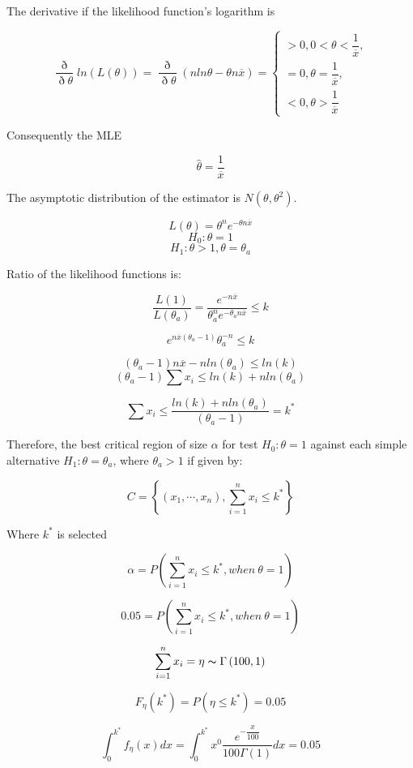 \documentclass[12pt]{article}
\begin{document}
\begin{list}{()~}{}
The derivative if the likelihood function's logarithm is

\[\dfrac{\eth}{\eth \theta}ln\left(L\left(\theta\right)\right)=\dfrac{\eth}{\eth \theta}\left(n ln\theta-\theta n \overline{x}\right)=\left\{
\begin{array}{l}
>0, 0 < \theta < \dfrac{1}{\overline{x}},\\
=0, \theta=\dfrac{1}{\overline{x}},\\
<0, \theta > \dfrac{1}{\overline{x}}
\end{array} \right. \]

Consequently the MLE

\[\hat{\theta}=\dfrac{1}{\overline{x}}\]

The asymptotic distribution of the estimator is $N\left(\theta, \theta^2\right)$.

\item
\[L\left(\theta\right)=\theta^n e^{-\theta n \overline{x}}\]
\[H_0: \theta = 1\]
\[H_1: \theta>1, \theta = \theta_a\]

Ratio of the likelihood functions is:

\[\dfrac{L\left(1\right)}{L\left(\theta_a\right)}=\dfrac{e^{-n\overline{x}}}{\theta_a^n e^{-\theta_a n \overline{x}}}\leq k\]

\[e^{n\overline{x}\left(\theta_a-1\right)}\theta_a^{-n}\leq k\]

\[\left(\theta_a-1\right)n\overline{x}-n ln\left(\theta_a\right)\leq ln(k)\]
\[\left(\theta_a-1\right)\sum x_i \leq ln\left(k\right)+nln\left(\theta_a\right)\]

\[\sum x_i \leq \dfrac{ln\left(k\right)+nln\left(\theta_a\right)}{\left(\theta_a-1\right)}=k^*\]

Therefore,  the best critical region of size $\alpha$ for test $H_0: \theta=1$ against each simple alternative $H_1: \theta=\theta_a$, where $\theta_a>1$ if given by:

\[ C =\left\{\left(x_1, \cdots, x_n\right), \sum_{i=1}^n x_i\leq k^*\right\}\]

Where $k^*$ is selected 

\[\alpha = P\left(\sum_{i=1}^n x_i \leq k^*, when\  \theta=1\right)\]

\[0.05 = P\left(\sum_{i=1}^n x_i \leq k^*, when\  \theta=1\right)\]

\[\sum_{i=1}^n x_i = \eta \thicksim \Gamma\left(100, 1\right)\]

\[F_\eta\left(k^*\right)=P\left(\eta\leq k^*\right)=0.05\]

\[\int_0^{k^*}f_\eta\left( x\right)dx=\int_0^{k^*}x^0 \dfrac{e^{-\dfrac{x}{100}}}{100\Gamma\left(1\right)}dx=0.05\]


\end{list}
\end{document}
